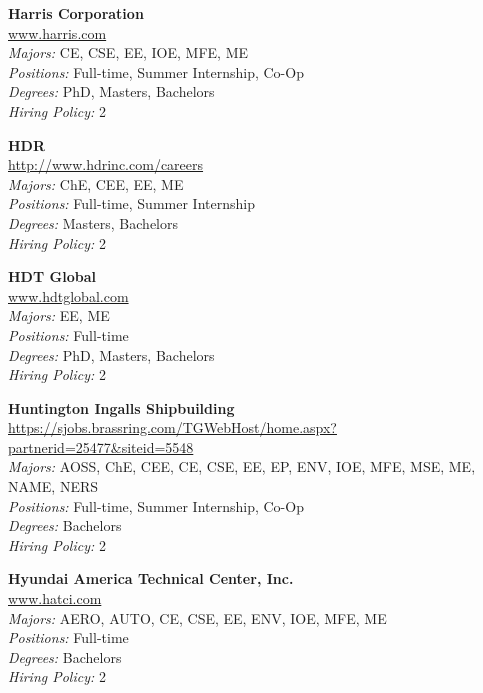 \documentclass{article}
\begin{document}
\begin{center}
\begin{multicols}{3}
\begin{minipage}{.9\columnwidth}{\Large\bf Harris Corporation }\\
	\url{www.harris.com}\\
	\emph{Majors:} CE, CSE, EE, IOE, MFE, ME\\
	\emph{Positions:} Full-time, Summer Internship, Co-Op\\
	\emph{Degrees:} PhD, Masters, Bachelors\\
	\emph{Hiring Policy:} 2\\
\end{minipage}
 
\begin{minipage}{.9\columnwidth}{\Large\bf HDR }\\
	\url{http://www.hdrinc.com/careers}\\
	\emph{Majors:} ChE, CEE, EE, ME\\
	\emph{Positions:} Full-time, Summer Internship\\
	\emph{Degrees:} Masters, Bachelors\\
	\emph{Hiring Policy:} 2\\
\end{minipage}
 
\begin{minipage}{.9\columnwidth}{\Large\bf HDT Global }\\
	\url{www.hdtglobal.com}\\
	\emph{Majors:} EE, ME\\
	\emph{Positions:} Full-time\\
	\emph{Degrees:} PhD, Masters, Bachelors\\
	\emph{Hiring Policy:} 2\\
\end{minipage}
 
\begin{minipage}{.9\columnwidth}{\Large\bf Huntington Ingalls Shipbuilding }\\
	\url{https://sjobs.brassring.com/TGWebHost/home.aspx?partnerid=25477&siteid=5548}\\
	\emph{Majors:} AOSS, ChE, CEE, CE, CSE, EE, EP, ENV, IOE, MFE, MSE, ME, NAME, NERS\\
	\emph{Positions:} Full-time, Summer Internship, Co-Op\\
	\emph{Degrees:} Bachelors\\
	\emph{Hiring Policy:} 2\\
\end{minipage}
 
\begin{minipage}{.9\columnwidth}{\Large\bf Hyundai America Technical Center, Inc. }\\
	\url{www.hatci.com}\\
	\emph{Majors:} AERO, AUTO, CE, CSE, EE, ENV, IOE, MFE, ME\\
	\emph{Positions:} Full-time\\
	\emph{Degrees:} Bachelors\\
	\emph{Hiring Policy:} 2\\
\end{minipage}
 

\end{multicols}
\end{center}
\end{document}
